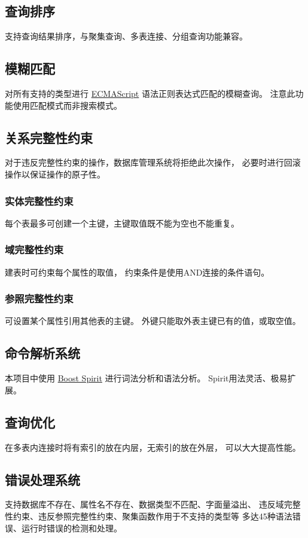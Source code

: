     \subsection{查询排序}
        支持查询结果排序，与聚集查询、多表连接、分组查询功能兼容。
    \subsection{模糊匹配}
        对所有支持的类型进行%
        \href{http://ecma-international.org/ecma-262/5.1/#sec-15.10}{ECMAScript}%
        语法正则表达式匹配的模糊查询。%
        注意此功能使用匹配模式而非搜索模式。
    \subsection{关系完整性约束}
        对于违反完整性约束的操作，数据库管理系统将拒绝此次操作，%
        必要时进行回滚操作以保证操作的原子性。
        \subsubsection{实体完整性约束}
            每个表最多可创建一个主键，主键取值既不能为空也不能重复。
        \subsubsection{域完整性约束}
            建表时可约束每个属性的取值，%
            约束条件是使用AND连接的条件语句。%
        \subsubsection{参照完整性约束}
            可设置某个属性引用其他表的主键。%
            外键只能取外表主键已有的值，或取空值。
    \subsection{命令解析系统}
        本项目中使用%
        \href{http://www.boost.org/doc/libs/1_57_0/libs/spirit/doc/html/index.html}{Boost Spirit}%
        进行词法分析和语法分析。%
        Spirit用法灵活、极易扩展。
    \subsection{查询优化}
        在多表内连接时将有索引的放在内层，无索引的放在外层，%
        可以大大提高性能。
    \subsection{错误处理系统}
        支持数据库不存在、属性名不存在、数据类型不匹配、字面量溢出、%
        违反域完整性约束、违反参照完整性约束、聚集函数作用于不支持的类型等%
        多达45种语法错误、运行时错误的检测和处理。
